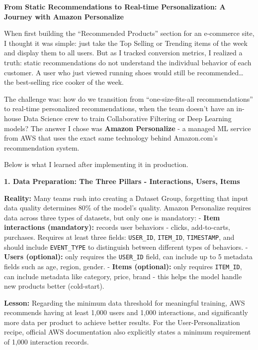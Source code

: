 \vspace{0.5em}\noindent\textbf{From Static Recommendations to Real-time Personalization: A
Journey with Amazon
Personalize}\par

When first building the ``Recommended Products'' section for an
e-commerce site, I thought it was simple: just take the Top Selling or
Trending items of the week and display them to all users. But as I
tracked conversion metrics, I realized a truth: static recommendations
do not understand the individual behavior of each customer. A user who
just viewed running shoes would still be recommended\ldots{} the
best-selling rice cooker of the week.

The challenge was: how do we transition from ``one-size-fits-all
recommendations'' to real-time personalized recommendations, when the
team doesn't have an in-house Data Science crew to train Collaborative
Filtering or Deep Learning models? The answer I chose was \textbf{Amazon
Personalize} - a managed ML service from AWS that uses the exact same
technology behind Amazon.com's recommendation system.

Below is what I learned after implementing it in production.

\vspace{0.5em}\noindent\textbf{1. Data Preparation: The Three Pillars - Interactions, Users,
Items}\par

\textbf{Reality:} Many teams rush into creating a Dataset Group,
forgetting that input data quality determines 80\% of the model's
quality. Amazon Personalize requires data across three types of
datasets, but only one is mandatory: - \textbf{Item interactions
(mandatory):} records user behaviors - clicks, add-to-carts, purchases.
Requires at least three fields: \texttt{USER\_ID}, \texttt{ITEM\_ID},
\texttt{TIMESTAMP}, and should include \texttt{EVENT\_TYPE} to
distinguish between different types of behaviors. - \textbf{Users
(optional):} only requires the \texttt{USER\_ID} field, can include up
to 5 metadata fields such as age, region, gender. - \textbf{Items
(optional):} only requires \texttt{ITEM\_ID}, can include metadata like
category, price, brand - this helps the model handle new products better
(cold-start).

\textbf{Lesson:} Regarding the minimum data threshold for meaningful
training, AWS recommends having at least 1,000 users and 1,000
interactions, and significantly more data per product to achieve better
results. For the User-Personalization recipe, official AWS documentation
also explicitly states a minimum requirement of 1,000 interaction
records.

